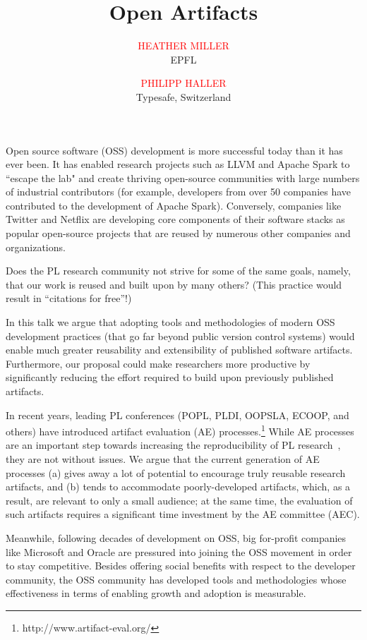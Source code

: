\documentclass[acmtocl]{acmtrans2m}
\title{{\color{Red}Open Artifacts}}
\author{\textcolor{Red}{HEATHER MILLER}\\EPFL \and
\textcolor{Red}{PHILIPP HALLER}\\Typesafe, Switzerland}
\begin{document}
%
\maketitle


Open source software (OSS) development is more successful today than it has
ever been. It has enabled research projects such as LLVM and Apache Spark to
``escape the lab" and create thriving open-source communities with large
numbers of industrial contributors (for example, developers from over 50
companies have contributed to the development of Apache Spark). Conversely,
companies like Twitter and Netflix are developing core components of their
software stacks as popular open-source projects that are reused by numerous
other companies and organizations.

Does the PL research community not strive for some of the same goals, namely,
that our work is reused and built upon by many others? (This practice would
result in ``citations for free''!)

In this talk we argue that adopting tools and methodologies of modern OSS
development practices (that go far beyond public version control systems)
would enable much greater reusability and extensibility of published software
artifacts. Furthermore, our proposal could make researchers more productive by
significantly reducing the effort required to build upon previously published
artifacts.

In recent years, leading PL conferences (POPL, PLDI, OOPSLA, ECOOP, and
others) have introduced artifact evaluation (AE)
processes.\footnote{http://www.artifact-eval.org/} While AE processes are an
important step towards increasing the reproducibility of PL
research~\cite{Vitek14}, they are not without issues. We argue that the
current generation of AE processes (a) gives away a lot of potential to
encourage truly reusable research artifacts, and (b) tends to accommodate
poorly-developed artifacts, which, as a result, are relevant to only a small
audience; at the same time, the evaluation of such artifacts requires a
significant time investment by the AE committee (AEC).

Meanwhile, following decades of development on OSS, big for-profit companies
like Microsoft and Oracle are pressured into joining the OSS movement in order
to stay competitive. Besides offering social benefits with respect to the
developer community, the OSS community has developed tools and methodologies
whose effectiveness in terms of enabling growth and adoption is measurable.
\end{document}
